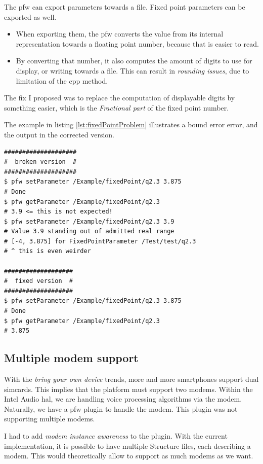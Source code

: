 The \gls{pfw} can export parameters towards a file. Fixed
point parameters can be exported as well.
\begin{itemize}
    \item When exporting them, the \gls{pfw} converts the value from
        its internal representation towards a floating point number, because that is
        easier to read.
    \item By converting that number, it also computes the amount of digits
        to use for display, or writing towards a file. This can result in
        \emph{rounding issues}, due to limitation of the \gls{cpp} method.
\end{itemize}
The fix I proposed was to replace the computation of displayable digits by something
easier, which is the \emph{Fractional part} of the fixed point number.

The example in listing \ref {lst:fixedPointProblem} illustrates a bound error error, and the output in the corrected version.
\begin{lstlisting}[caption=$Q.2.3$ rounding issue example, label=lst:fixedPointProblem]
####################
#  broken version  #
####################
$ pfw setParameter /Example/fixedPoint/q2.3 3.875
# Done
$ pfw getParameter /Example/fixedPoint/q2.3
# 3.9 <= this is not expected!
$ pfw setParameter /Example/fixedPoint/q2.3 3.9
# Value 3.9 standing out of admitted real range
# [-4, 3.875] for FixedPointParameter /Test/test/q2.3
# ^ this is even weirder

###################
#  fixed version  #
###################
$ pfw setParameter /Example/fixedPoint/q2.3 3.875
# Done
$ pfw getParameter /Example/fixedPoint/q2.3
# 3.875
\end{lstlisting}


\subsection{Multiple modem support}
With the \emph{bring your own device} trends, more and more smartphones support dual simcards. This implies that the platform must support two modems.
Within the Intel Audio \gls{hal}, we are handling voice processing algorithms via the modem.
Naturally, we have a \gls{pfw} plugin to handle the modem. This plugin was not supporting multiple modems.

I had to add \emph{modem instance awareness} to the plugin. With the current implementation, it
is possible to have multiple Structure files, each describing a modem. This would theoretically allow
to support as much modems as we want.

